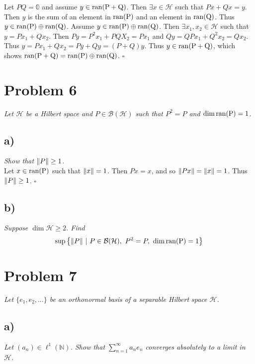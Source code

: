 \documentclass[12pt]{article}
\theoremstyle{plain}
\begin{document}
Let $PQ = \mathbb{0}$ and assume $y \in \rm{ran}(P + Q)$.  Then $\exists x \in \mathcal{H}$ such that $Px + Qx = y$.  Then $y$ is the sum of an element in $\rm{ran}(P)$ and an element in $\rm{ran}(Q)$.  Thus $y \in \rm{ran}(P) \oplus \rm{ran}(Q)$.  Assume $y \in \rm{ran}(P) \oplus \rm{ran}(Q)$.  Then $\exists x_1, x_2 \in \mathcal{H}$ such that $y = Px_1 + Qx_2$.  Then $Py = P^2x_1 + PQ X_2 = Px_1$ and $Qy = QPx_1 + Q^2x_2 = Qx_2$.  Thus $y = Px_1 + Qx_2 = Py + Qy = (P + Q)y$.  Thus $y \in \rm{ran}(P + Q)$, which shows $\rm{ran}(P + Q) = \rm{ran}(P)\oplus\rm{ran}(Q)$. \hfill $\square$


\section*{Problem 6}
\emph{Let $\mathcal{H}$ be a Hilbert space and $P \in \mathcal{B}(\mathcal{H})$ such that $P^2 = P$ and $\dim\rm{ran}(P) = 1$.}

\subsection*{ a)}
\emph{Show that $\norm{P} \geq 1$.} \\

Let $x \in \rm{ran}(P)$ such that $\norm{x} = 1$.  Then $Px = x$, and so $\norm{Px} = \norm{x} = 1$.  Thus $\norm{P} \geq 1$. \hfill $\square$

\subsection*{ b)}
\emph{Suppose $\dim\mathcal{H} \geq 2$.  Find}
\begin{align*}
    \sup\left\{\norm{P}\ |\ P\in\mathcal{B}(\mathcal{H}),\ P^2 = P,\ \dim\rm{ran}(P) = 1\right\}
\end{align*}

\section*{Problem 7}
\emph{Let $\{e_1, e_2, \dots\}$ be an orthonormal basis of a separable Hilbert space $\mathcal{H}$.}

\subsection*{ a)}
\emph{Let $(a_n) \in \ell^1(\mathbb{N})$.  Show that $\sum_{n=1}^\infty a_ne_n$ converges absolutely to a limit in $\mathcal{H}$.}
\end{document}
